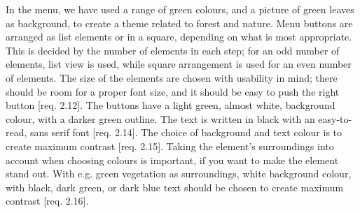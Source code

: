 In the menu, we have used a range of green colours, and a picture of green leaves as background, to create a theme related to forest and nature. Menu buttons are arranged as list elements or in a square, depending on what is most appropriate. This is decided by the number of elements in each step; for an odd number of elements, list view is used, while square arrangement is used for an even number of elements. The size of the elements are chosen with usability in mind; there should be room for a proper font size, and it should be easy to push the right button [req. 2.12]. The buttons have a light green, almost white, background colour, with a darker green outline. The text is written in black with an easy-to-read, sans serif font [req. 2.14]. The choice of background and text colour is to create maximum contrast [req. 2.15]. Taking the element's surroundings into account when choosing colours is important, if you want to make the element stand out. With e.g. green vegetation as surroundings, white background colour, with black, dark green, or dark blue text should be chosen to create maximum contrast [req. 2.16]. 


